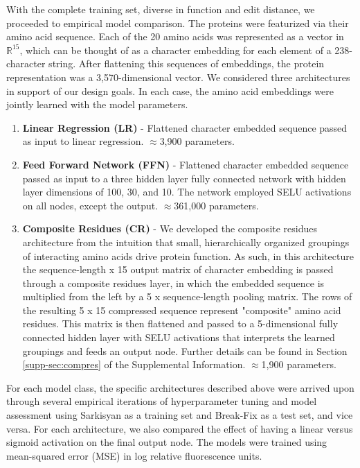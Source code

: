With the complete training set, diverse in function and edit distance, we proceeded to empirical model comparison.
The proteins were featurized via their amino acid sequence.
Each of the 20 amino acids was represented as a vector in~$\mathbb{R}^{15}$, which can be thought of as a character embedding for each element of a 238-character string.
After flattening this sequences of embeddings, the protein representation was a 3,570-dimensional vector.
We considered three architectures in support of our design goals.
In each case, the amino acid embeddings were jointly learned with the model parameters.

\begin{enumerate}
  \item \textbf{Linear Regression (LR)} - Flattened character embedded sequence passed as input to linear regression. $\approx$3,900 parameters.
  \item \textbf{Feed Forward Network (FFN)} - Flattened character embedded sequence passed as input to a three hidden layer fully connected network with hidden layer dimensions of 100, 30, and 10. The network employed SELU  \cite{klambauer2017self} activations on all nodes, except the output. $\approx$361,000 parameters.
    \item \textbf{Composite Residues (CR)} - We developed the composite residues architecture from the intuition that small, hierarchically organized groupings of interacting amino acids drive protein function. As such, in this architecture the sequence-length x 15 output matrix of character embedding is passed through a composite residues layer, in which the embedded sequence is multiplied from the left by a 5 x sequence-length pooling matrix. The rows of the resulting 5 x 15 compressed sequence represent "composite" amino acid residues. This matrix is then flattened and passed to a 5-dimensional fully connected hidden layer with SELU activations that interprets the learned groupings and feeds an output node.  Further details can be found in Section \ref{supp-sec:compres} of the Supplemental Information. $\approx$1,900 parameters.
\end{enumerate}

For each model class, the specific architectures described above were arrived upon through several empirical iterations of hyperparameter tuning and model assessment using Sarkisyan as a training set and Break-Fix as a test set, and vice versa. For each architecture, we also compared the effect of having a linear versus sigmoid activation on the final output node. The models were trained using mean-squared error (MSE) in log relative fluorescence units.

